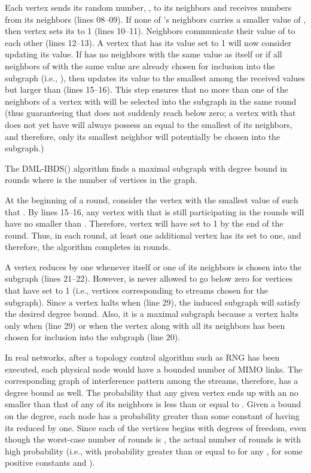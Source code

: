 \documentclass[journal,12pt,onecolumn]{IEEEtran}
\newenvironment{proof}[1][Proof]{\begin{trivlist}
\item[\hskip \labelsep {\bfseries #1}]}{\end{trivlist}}
\begin{document}
Each vertex  sends its
random number, , to its neighbors and receives numbers from its
neighbors (lines 08--09). If none of 's 
neighbors carries a smaller value of , then vertex  sets its
 to 1 (lines 10--11). Neighbors communicate their value of  to each other
(lines 12--13). A vertex that has its  value set to 1 will now consider
updating its  value. If  has no neighbors with the same 
value as itself or if all neighbors of  with the same  value are
already chosen for inclusion into the subgraph (i.e., ), then  updates
its  value to the smallest among the received values but larger
than  (lines 15--16). This step ensures that no more than one
of the neighbors of a vertex with  will be selected into the
subgraph in the same round (thus guaranteeing that  does not
suddenly reach below zero; a vertex  with  that does not yet
have  will always possess an  equal to the smallest of
its neighbors, and therefore, only its smallest neighbor will
potentially be chosen into the subgraph.) 

\theorem The DML-IBDS() algorithm finds a maximal subgraph
with degree bound  in  rounds where  is the number of
vertices in the graph. 

\begin{proof}
At the beginning of a round, consider the vertex  with the
smallest value of  such that . By lines 15--16, any
vertex  with  that is still participating in the
rounds will have  no smaller than . Therefore, vertex 
will have  set to 1 by the end of the round. Thus, in each
round, at least one additional vertex has its  set to one, and
therefore, the algorithm completes in  rounds.

A vertex  reduces  by one whenever itself or one of its
neighbors is chosen into the subgraph (lines 21--22). However,  is never allowed to go
below zero for vertices that have  set to 1 (i.e., vertices
corresponding to streams chosen for the subgraph). Since a vertex
halts when  (line 29), the induced 
subgraph will satisfy the desired degree bound. Also, it is a maximal
subgraph because a vertex halts only when  (line 29) or when the
vertex along with all its neighbors has been chosen for inclusion into
the subgraph (line 20).
\end{proof}

In real networks, after a topology control algorithm such as RNG has
been executed, each physical node would have a bounded number of MIMO
links. The corresponding graph of interference pattern among the
streams, therefore, has a degree bound as well. The probability that any
given vertex  ends up with an  no smaller than that of
any of its neighbors is less than or equal to . Given
a bound on the degree, each node has a probability greater than some
constant of having its  reduced by one. Since each of the 
vertices begins with  degrees of freedom, even though the worst-case
number of rounds is , the actual number of rounds is  with high probability (i.e., with probability greater than or
equal to  for any ,  for some positive
constants  and ). 
\end{document}
